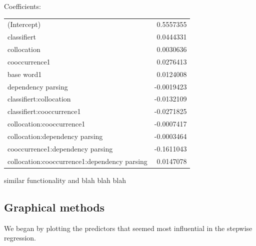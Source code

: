 \documentclass{article}
\begin{document}
Coefficients:

\begin{tabular}{l r}
                                (Intercept) & 0.5557355 \\
                                classifiert & 0.0444331  \\
                                 collocation & 0.0030636  \\
                              cooccurrence1 & 0.0276413 \\
                                 base word1 & 0.0124008  \\
                         dependency parsing & -0.0019423 \\
                     classifiert:collocation & -0.0132109 \\
                  classifiert:cooccurrence1 & -0.0271825 \\
                   collocation:cooccurrence1 & -0.0007417 \\
              collocation:dependency parsing & -0.0003464 \\
           cooccurrence1:dependency parsing & -0.1611043 \\
collocation:cooccurrence1:dependency parsing & 0.0147078  \\
\end{tabular}


similar functionality and blah blah blah

\subsection{Graphical methods}
We began by plotting the predictors that seemed most influential in the
stepwise regression.
\end{document}
